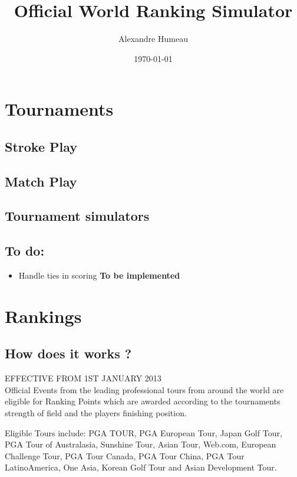 \documentclass{article}
\begin{document}
\title{Official World Ranking Simulator}
\author{Alexandre Humeau}
\date{\today}
\maketitle
\clearpage

\tableofcontents
\clearpage

\section{Tournaments}
\subsection{Stroke Play}
\subsection{Match Play}
\subsection{Tournament simulators}

\subsection{To do:}
\begin{itemize}
	\item Handle ties in scoring 
\textbf{\color{orange} To be implemented}
\end{itemize}

\section{Rankings}
\subsection{How does it works ?}
EFFECTIVE FROM 1ST JANUARY 2013\\
Official Events from the leading professional tours from around the world are eligible for Ranking Points which are awarded according to the tournaments strength of field and the players finishing position.

Eligible Tours include: PGA TOUR, PGA European Tour, Japan Golf Tour, PGA Tour of Australasia, Sunshine Tour, Asian Tour, Web.com, European Challenge Tour, PGA Tour Canada, PGA Tour China, PGA Tour LatinoAmerica, One Asia, Korean Golf Tour and Asian Development Tour.
\end{document}
